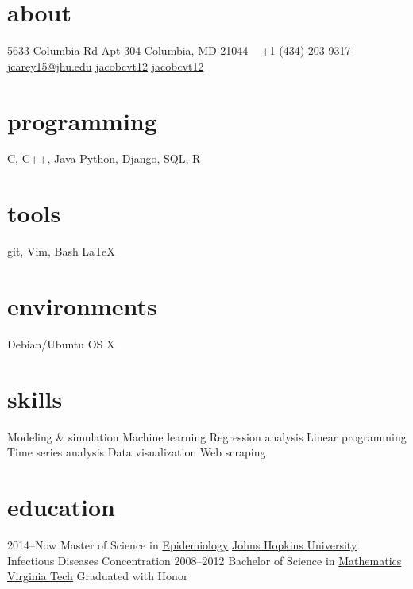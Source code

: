 \documentclass[]{friggeri-cv} %
\begin{document}



\begin{aside} %
\section{about}
5633 Columbia Rd
Apt 304
Columbia, MD 21044
~
\href{tel:14342039317}{\faPhone +1 (434) 203 9317}
\href{mailto:jcarey15@jhu.edu}{\faEnvelope  jcarey15@jhu.edu}
\href{https://github.com/jacobcvt12}{\faGithub jacobcvt12}
\href{https://www.linkedin.com/in/jacobcvt12}{\faLinkedin jacobcvt12}
\section{programming}
C, C++, Java
Python, Django,
SQL, R
\section{tools}
git, Vim, Bash
\LaTeX
\section{environments}
Debian/Ubuntu
OS X
\section{skills}
Modeling \& simulation
Machine learning
Regression analysis
Linear programming
Time series analysis
Data visualization
Web scraping
\end{aside}


\section{education}

\begin{entrylist}
\entry
{2014--Now}
{Master {\normalfont of Science in}
\href{http://www.jhsph.edu/departments/epidemiology/}{Epidemiology}}
{\href{http://www.jhu.edu}{Johns Hopkins University}}
{Infectious Diseases Concentration}
\entry
{2008--2012}
{Bachelor {\normalfont of Science in}
\href{https://www.math.vt.edu/}{Mathematics}}
{\href{http://www.vt.edu}{Virginia Tech}}
{Graduated with Honor}
\end{entrylist}
\end{document}
